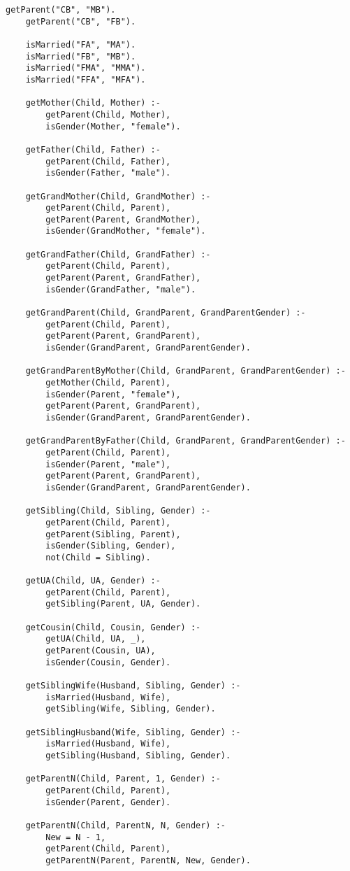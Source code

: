 \begin{lstlisting}[caption=Программа <<Предки>>]
	getParent("CB", "MB").
	getParent("CB", "FB").
	
	isMarried("FA", "MA").
	isMarried("FB", "MB").
	isMarried("FMA", "MMA").
	isMarried("FFA", "MFA").	
	
	getMother(Child, Mother) :-
		getParent(Child, Mother),
		isGender(Mother, "female").
	
	getFather(Child, Father) :- 
		getParent(Child, Father),
		isGender(Father, "male").	
	
	getGrandMother(Child, GrandMother) :-
		getParent(Child, Parent),
		getParent(Parent, GrandMother),
		isGender(GrandMother, "female").
	
	getGrandFather(Child, GrandFather) :-
		getParent(Child, Parent),
		getParent(Parent, GrandFather),
		isGender(GrandFather, "male").
	
	getGrandParent(Child, GrandParent, GrandParentGender) :- 
		getParent(Child, Parent),
		getParent(Parent, GrandParent),
		isGender(GrandParent, GrandParentGender).
	
	getGrandParentByMother(Child, GrandParent, GrandParentGender) :- 
		getMother(Child, Parent),
		isGender(Parent, "female"),
		getParent(Parent, GrandParent),
		isGender(GrandParent, GrandParentGender).
	
	getGrandParentByFather(Child, GrandParent, GrandParentGender) :- 
		getParent(Child, Parent),
		isGender(Parent, "male"),
		getParent(Parent, GrandParent),
		isGender(GrandParent, GrandParentGender).	
	
	getSibling(Child, Sibling, Gender) :- 
		getParent(Child, Parent),
		getParent(Sibling, Parent),
		isGender(Sibling, Gender),
		not(Child = Sibling).
	
	getUA(Child, UA, Gender) :-
		getParent(Child, Parent),
		getSibling(Parent, UA, Gender).
	
	getCousin(Child, Cousin, Gender) :- 
		getUA(Child, UA, _),
		getParent(Cousin, UA),
		isGender(Cousin, Gender).
	
	getSiblingWife(Husband, Sibling, Gender) :-
		isMarried(Husband, Wife),
		getSibling(Wife, Sibling, Gender).
	
	getSiblingHusband(Wife, Sibling, Gender) :-
		isMarried(Husband, Wife),
		getSibling(Husband, Sibling, Gender).
	
	getParentN(Child, Parent, 1, Gender) :-
		getParent(Child, Parent),
		isGender(Parent, Gender).
	
	getParentN(Child, ParentN, N, Gender) :-
		New = N - 1,
		getParent(Child, Parent),
		getParentN(Parent, ParentN, New, Gender).
	

\end{lstlisting}
